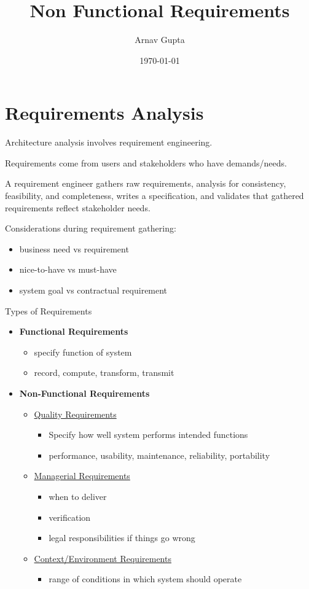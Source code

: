 \documentclass[11pt]{article}
\author{Arnav Gupta}
\date{\today}
\title{Non Functional Requirements}
\begin{document}
\maketitle
\tableofcontents

\section{Requirements Analysis}
\label{sec:orgd181184}
Architecture analysis involves requirement engineering.

Requirements come from users and stakeholders who have demands/needs.

A requirement engineer gathers raw requirements, analysis for consistency,
feasibility, and completeness, writes a specification, and validates that
gathered requirements reflect stakeholder needs.

Considerations during requirement gathering:
\begin{itemize}
\item business need vs requirement
\item nice-to-have vs must-have
\item system goal vs contractual requirement
\end{itemize}

Types of Requirements
\begin{itemize}
\item \textbf{Functional Requirements}
\begin{itemize}
\item specify function of system
\item record, compute, transform, transmit
\end{itemize}
\item \textbf{Non-Functional Requirements}
\begin{itemize}
\item \uline{Quality Requirements}
\begin{itemize}
\item Specify how well system performs intended functions
\item performance, usability, maintenance, reliability, portability
\end{itemize}
\item \uline{Managerial Requirements}
\begin{itemize}
\item when to deliver
\item verification
\item legal responsibilities if things go wrong
\end{itemize}
\item \uline{Context/Environment Requirements}
\begin{itemize}
\item range of conditions in which system should operate
\end{itemize}
\end{itemize}
\end{itemize}
\end{document}
